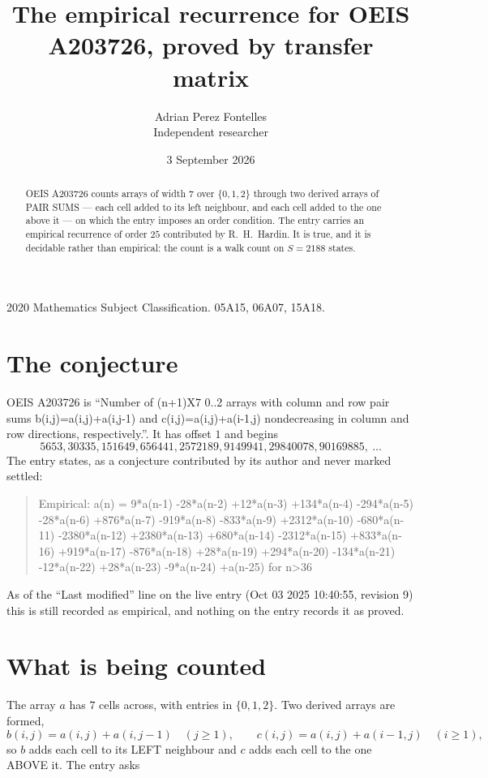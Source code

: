 \documentclass[11pt,a4paper]{article}
\title{The empirical recurrence for OEIS A203726, proved by transfer matrix}
\author{Adrian Perez Fontelles\\ \small Independent researcher}
\date{3 September 2026}
\theoremstyle{plain}
\theoremstyle{definition}
\begin{document}
\maketitle

\begin{abstract}
OEIS A203726 counts arrays of width $7$ over $\{0,1,2\}$ through two derived arrays of PAIR SUMS ---
each cell added to its left neighbour, and each cell added to the one above it --- on which the
entry imposes an order condition. The entry carries an empirical recurrence of order $25$
contributed by R.~H.~Hardin. It is true, and it is decidable rather than empirical: the count is
a walk count on $S=2188$ states.
\end{abstract}

\noindent\small 2020 Mathematics Subject Classification. 05A15, 06A07, 15A18.\normalsize

\section{The conjecture}

OEIS A203726 is ``Number of (n+1)X7 0..2 arrays with column and row pair sums b(i,j)=a(i,j)+a(i,j-1) and c(i,j)=a(i,j)+a(i-1,j) nondecreasing in column and row directions, respectively.''. It has offset $1$ and begins
\[
5653, 30335, 151649, 656441, 2572189, 9149941, 29840078, 90169885,\ \dots
\]
The entry states, as a conjecture contributed by its author and never marked settled:
\begin{quote}
Empirical: a(n) = 9*a(n-1) -28*a(n-2) +12*a(n-3) +134*a(n-4) -294*a(n-5) -28*a(n-6) +876*a(n-7) -919*a(n-8) -833*a(n-9) +2312*a(n-10) -680*a(n-11) -2380*a(n-12) +2380*a(n-13) +680*a(n-14) -2312*a(n-15) +833*a(n-16) +919*a(n-17) -876*a(n-18) +28*a(n-19) +294*a(n-20) -134*a(n-21) -12*a(n-22) +28*a(n-23) -9*a(n-24) +a(n-25) for n>36
\end{quote}
As of the ``Last modified'' line on the live entry (Oct 03 2025 10:40:55, revision 9) this is still
recorded as empirical, and nothing on the entry records it as proved.

\section{What is being counted}

The array $a$ has $7$ cells across, with entries in $\{0,1,2\}$. Two derived arrays are formed,
\[
b(i,j)=a(i,j)+a(i,j-1)\quad(j\ge1),\qquad c(i,j)=a(i,j)+a(i-1,j)\quad(i\ge1),
\]
so $b$ adds each cell to its LEFT neighbour and $c$ adds each cell to the one ABOVE it. The
entry asks
\end{document}
